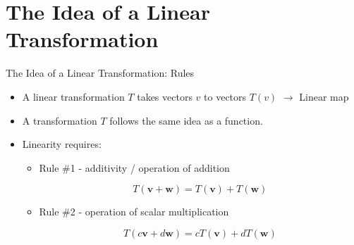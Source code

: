 \section{The Idea of a Linear Transformation}                                               

\begin{frame}[t]{The Idea of a Linear Transformation: Rules}
    \begin{itemize}
        \item A linear transformation $T$ takes vectors $v$ to vectors $T(v)$
            $\rightarrow$ Linear map
        \item A transformation $T$ follows the same idea as a function.
        \item Linearity requires:
            \begin{itemize}
                \item Rule \#1 - additivity / operation of addition
                  \begin{block}{}
                     \begin{equation*}
                         T(\textbf{v}+\textbf{w}) = T(\textbf{v}) + T(\textbf{w})
                     \end{equation*}
                  \end{block}
                \item Rule \#2 - operation of scalar multiplication
                  \begin{block}{}
                     \begin{equation*}
                         T(c\textbf{v}+d\textbf{w}) = cT(\textbf{v}) +
                         dT(\textbf{w})
                     \end{equation*}
                  \end{block}
            \end{itemize}
    \end{itemize}
\end{frame}

